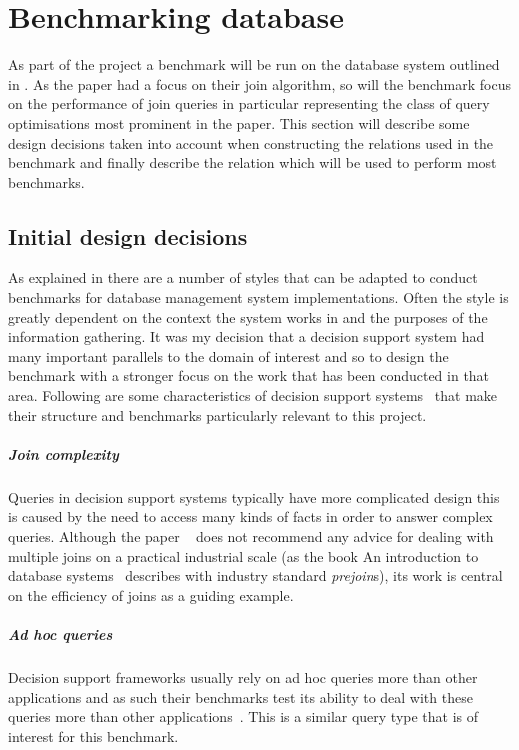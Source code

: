 \section{Benchmarking database}
As part of the project a benchmark will be run on the database system outlined
in . As the paper \relalg{} had a focus on their join algorithm, so will the benchmark focus
on the performance of join queries in particular representing the class of query
optimisations most prominent in the paper. This section will describe some design
decisions taken into account when constructing the relations used in the
benchmark and finally describe the  relation which will be
used to perform most benchmarks.

\subsection{Initial design decisions}
As explained in  there are a number of styles that can be adapted to
conduct benchmarks for database management system implementations. Often the
style is greatly dependent on the context the system works in and the purposes
of the information gathering. It was my decision that a decision support system
had many important parallels to the domain of interest and so to design the
benchmark with a stronger focus on the work that has been conducted in that
area. Following are some characteristics of decision support
systems~\cite{IntroToDatabaseSystems}
that make their structure and benchmarks particularly relevant to this
project.

\subparagraph{Join complexity} Queries in decision support systems typically
have more complicated design this is caused by the need to access many
kinds of facts in order to answer complex queries. Although the
paper \relalg{}~\cite{RelationalAlgebraByWayOfAdjunctions}
does not recommend any advice for dealing with multiple joins on a practical
industrial scale (as the book An introduction to database
systems~\cite{IntroToDatabaseSystems} describes with industry
standard \emph{prejoin}s), its work is central on the efficiency of joins as a
guiding example.

\subparagraph{Ad hoc queries} Decision support frameworks usually rely on ad hoc
queries more than other applications and as such their benchmarks test its
ability to deal with these queries more than other applications~\cite{SetQueryBenchmark, PractitionersIntroduction}. This is a similar
query type that is of interest for this benchmark.

